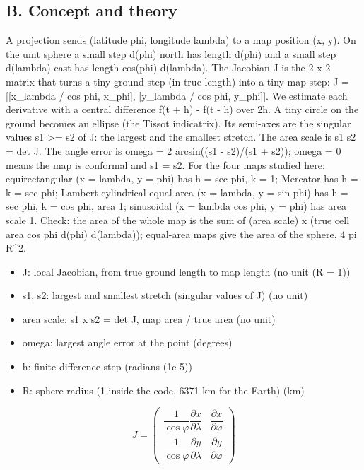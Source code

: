 \documentclass[11pt,a4paper]{article}
\begin{document}
\subsection*{B. Concept and theory}
A projection sends (latitude phi, longitude lambda) to a map position (x, y). On the unit sphere a small step d(phi) north has length d(phi) and a small step d(lambda) east has length cos(phi) d(lambda). The Jacobian J is the 2 x 2 matrix that turns a tiny ground step (in true length) into a tiny map step: J = [[x\_lambda / cos phi, x\_phi], [y\_lambda / cos phi, y\_phi]]. We estimate each derivative with a central difference f(t + h) - f(t - h) over 2h. A tiny circle on the ground becomes an ellipse (the Tissot indicatrix). Its semi-axes are the singular values s1 \textgreater{}= s2 of J: the largest and the smallest stretch. The area scale is s1 s2 = \textbar{}det J\textbar{}. The angle error is omega = 2 arcsin((s1 - s2)/(s1 + s2)); omega = 0 means the map is conformal and s1 = s2. For the four maps studied here: equirectangular (x = lambda, y = phi) has h = sec phi, k = 1; Mercator has h = k = sec phi; Lambert cylindrical equal-area (x = lambda, y = sin phi) has h = sec phi, k = cos phi, area 1; sinusoidal (x = lambda cos phi, y = phi) has area scale 1. Check: the area of the whole map is the sum of (area scale) x (true cell area cos phi d(phi) d(lambda)); equal-area maps give the area of the sphere, 4 pi R\textasciicircum{}2.

\begin{itemize}[nosep]
\item J: local Jacobian, from true ground length to map length (no unit (R = 1))
\item s1, s2: largest and smallest stretch (singular values of J) (no unit)
\item area scale: s1 x s2 = \textbar{}det J\textbar{}, map area / true area (no unit)
\item omega: largest angle error at the point (degrees)
\item h: finite-difference step (radians (1e-5))
\item R: sphere radius (1 inside the code, 6371 km for the Earth) (km)
\end{itemize}

\begin{equation*}
J=\begin{pmatrix}\dfrac{1}{\cos\varphi}\dfrac{\partial x}{\partial\lambda} & \dfrac{\partial x}{\partial\varphi}\\[2mm] \dfrac{1}{\cos\varphi}\dfrac{\partial y}{\partial\lambda} & \dfrac{\partial y}{\partial\varphi}\end{pmatrix}
\end{equation*}
\end{document}
